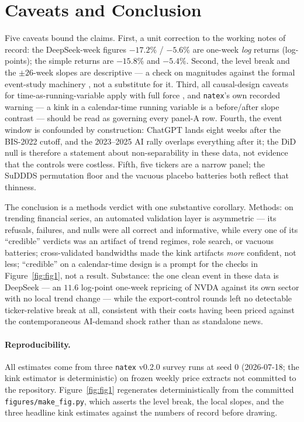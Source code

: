 \documentclass[11pt]{article}
\newcommand{\natex}{\texttt{natex}}
\begin{document}
\section{Caveats and Conclusion}\label{sec:conclusion}

Five caveats bound the claims. First, a unit correction to the working notes
of record: the DeepSeek-week figures $-17.2\%$ / $-5.6\%$ are one-week
\emph{log} returns (log-points); the simple returns are $-15.8\%$ and
$-5.4\%$. Second, the level break and the $\pm 26$-week slopes are
descriptive --- a check on magnitudes against the formal event-study
machinery \cite{mackinlay1997,han2025}, not a substitute for it. Third, all causal-design caveats for time-as-running-variable
apply with full force \cite{hausman2018}, and \natex's own recorded warning
--- a kink in a calendar-time running variable is a before/after slope
contrast --- should be read as governing every panel-A row. Fourth, the event
window is confounded by construction: ChatGPT lands eight weeks after the
BIS-2022 cutoff, and the 2023--2025 AI rally overlaps everything after it;
the DiD null is therefore a statement about non-separability in these data,
not evidence that the controls were costless. Fifth, five tickers are a
narrow panel; the SuDDDS permutation floor and the vacuous placebo batteries
both reflect that thinness.

The conclusion is a methods verdict with one substantive corollary. Methods:
on trending financial series, an automated validation layer is asymmetric ---
its refusals, failures, and nulls were all correct and informative, while
every one of its ``credible'' verdicts was an artifact of trend regimes,
role search, or vacuous batteries; cross-validated bandwidths made the kink
artifacts \emph{more} confident, not less; ``credible'' on a calendar-time
design is a prompt for the checks in Figure~\ref{fig:fig1}, not a result.
Substance: the one clean event in these data is DeepSeek --- an $11.6$
log-point one-week repricing of NVDA against its own sector with no local
trend change --- while the export-control rounds left no detectable
ticker-relative break at all, consistent with their costs having been priced
against the contemporaneous AI-demand shock rather than as standalone news.

\paragraph{Reproducibility.} All estimates come from three \natex{} v0.2.0
survey runs at seed 0 (2026-07-18; the kink estimator is deterministic) on
frozen weekly price extracts not committed to the repository.
Figure~\ref{fig:fig1} regenerates deterministically from the committed
\texttt{figures/make\_fig.py}, which asserts the level break, the local
slopes, and the three headline kink estimates against the numbers of record
before drawing.
\end{document}
